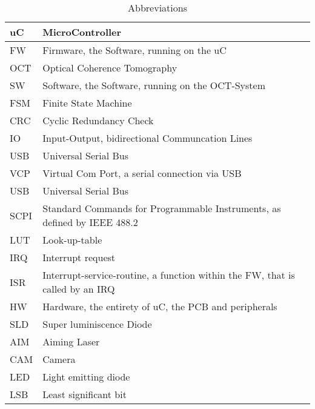 		\begin{table}[h!]
			\begin{tabular}{|p{3cm}|l|}
			\hline	
			uC		& MicroController							\\ \hline
			FW		& Firmware, the Software, running on the uC \\ \hline	
			OCT		& Optical Coherence Tomography				\\ \hline	
			SW		& Software, the Software, running on the OCT-System 	\\ \hline	
			FSM 	& Finite State Machine									\\ \hline
			CRC		& Cyclic Redundancy Check								\\ \hline
			IO		& Input-Output, bidirectional Communcation Lines 		\\ \hline
			USB		& Universal Serial Bus									\\ \hline
			VCP		& Virtual Com Port, a serial connection via USB			\\ \hline
			USB		& Universal Serial Bus									\\ \hline
			SCPI	& Standard Commands for Programmable Instruments, as defined by IEEE 488.2	\\ \hline
			LUT		& Look-up-table											\\ \hline
			IRQ		& Interrupt request										\\ \hline
			ISR		& Interrupt-service-routine, a function within the FW, that is called by an IRQ	\\ \hline
			HW		& Hardware, the entirety of uC, the PCB and peripherals	\\ \hline
			SLD		& Super luminiscence Diode								\\ \hline
			AIM		& Aiming Laser											\\ \hline
			CAM		& Camera												\\ \hline
			LED		& Light emitting diode									\\ \hline
			LSB		& Least significant bit									\\ \hline
			\end{tabular}
			\caption{Abbreviations}
		\end{table}
